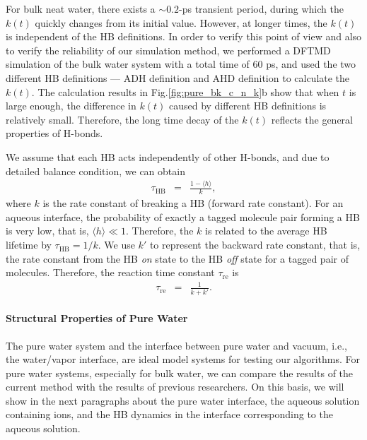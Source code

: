For bulk neat water, there exists a $\sim 0.2$-ps transient period,
during which the $k(t)$ quickly changes from its initial value. \cite{FWS00}
However, at longer times, the $k(t)$ is independent of the HB definitions.
In order to verify this point of view and also to verify the reliability of our simulation method, 
we performed a DFTMD simulation of the bulk water system with a total time of 60 ps, 
and used the two different HB definitions --- ADH definition and AHD definition to calculate the $k(t)$. 
The calculation results in Fig.\thinspace\ref{fig:pure_bk_c_n_k}b show that when $t$ is large enough, 
the difference in $k(t)$ caused by different HB definitions is relatively small.
Therefore, the long time decay of the $k(t)$ reflects the general properties of H-bonds.

We assume that each HB acts independently of other H-bonds, \cite{AL96,AL00} 
and due to detailed balance condition, we can obtain 
\begin{eqnarray}
  \tau_{\text{HB}} &=& \frac{1- \langle h\rangle}{k},
\label{eq:rate}
\end{eqnarray}
where $k$ is the rate constant of breaking a HB (forward rate constant). \cite{Chandler1986,Chandler1978} 
For an aqueous interface, the probability of exactly a tagged molecule pair forming a HB is very low, that is, $\langle h\rangle \ll 1$. Therefore,
the $k$ is related to the average HB lifetime by $\tau_{\text{HB}}=1/k$.
We use $k'$ to represent the backward rate constant, that is, the rate constant from the HB \emph{on} state to the HB \emph{off} state for a tagged pair of molecules.
Therefore, the reaction time constant $\tau_\text{re}$ is 
\begin{eqnarray}
  \tau_\text{re} &=& \frac{1}{k+k'}.
\label{eq:reaction_rate_tau}
\end{eqnarray}
%

\FloatBarrier
\paragraph{Structural Properties of Pure Water}
The pure water system and the interface between pure water and vacuum, i.e., the water/vapor interface, 
are ideal model systems for testing our algorithms.
For pure water systems, especially for bulk water, we can compare the results of the current method with the results of 
previous researchers.\cite{AL96,Kessler2015} On this basis, we will show in the next paragraphs about the pure water interface, 
the aqueous solution containing ions, and the HB dynamics in the interface corresponding to the aqueous solution.

